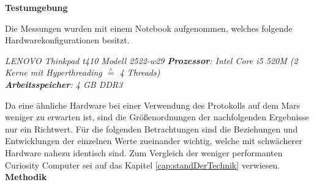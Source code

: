 \label{subCap:Messreihen}


\textbf{Testumgebung}

Die Messungen wurden mit einem Notebook aufgenommen, welches
folgende Hardwarekonfigurationen besitzt.

\textit{
	LENOVO Thinkpad t410 Modell 2522-w29 \newline
	\textbf{Prozessor}: Intel Core i5 520M (2 Kerne mit Hyperthreading $\stackrel{\wedge}=$ 4 Threads)\\
	\textbf{Arbeitsspeicher}: 4 GB DDR3	
	}

Da eine ähnliche Hardware bei einer Verwendung des Protokolls auf dem Mars
weniger zu erwarten ist, sind die Größenordnungen der nachfolgenden Ergebnisse
nur ein Richtwert. Für die folgenden Betrachtungen sind die Beziehungen und
Entwicklungen der einzelnen Werte zueinander wichtig, welche mit schwächerer
Hardware nahezu identisch sind. Zum Vergleich der weniger performanten Curiosity
Computer sei auf das Kapitel \ref{cap:standDerTechnik} verwiesen. 
\\

\textbf{Methodik}


